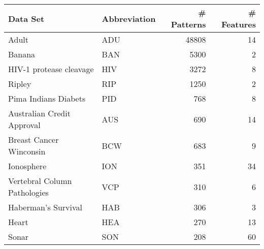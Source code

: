 \begin{tabular}{llrr}
\toprule
  Data Set
&  Abbreviation
& \# Patterns
& \# Features \\
\midrule
Adult									        &   ADU   &     48808 & 14 \\ 
Banana									      & 	BAN   & 	5300  & 2  \\ 
HIV-1 protease cleavage 			&   HIV   &     3272  & 8  \\ 
Ripley 						   	     		&   RIP   &     1250  & 2  \\ 
Pima Indians Diabets    			&   PID   &     768   & 8  \\ 
Australian Credit Approval    &   AUS   &     690   & 14 \\ 
Breast Cancer Winconsin  	   	&   BCW   &     683   & 9  \\ 
Ionosphere   				   			  &   ION   &     351   & 34 \\ 
Vertebral Column Pathologies  &   VCP   &     310   & 6  \\ 
Haberman's Survival			   		&   HAB   &     306   & 3  \\ 
Heart						   			      &   HEA   &     270   & 13 \\ 
Sonar   					   			    &   SON   &     208   & 60 \\ \bottomrule
\end{tabular}